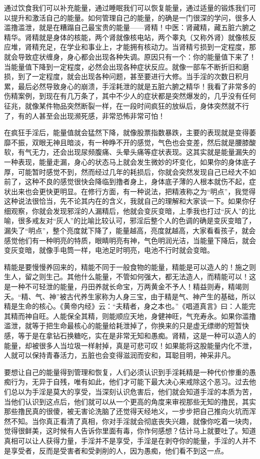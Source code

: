 通过饮食我们可以补充能量，通过睡眠我们可以恢复能量，通过适量的锻炼我们可以提升和激活自己的能量。如何管理自己的能量，的确是一门很深的学问，很多人滥撸滥泄，就是在糟蹋自己最宝贵的能量——肾精！中医：肾藏精，藏五脏六腑之精华。肾精就是身体的核能，两个肾就像核电站，两个睾丸（又称外肾）就像核反应堆，肾精充足，在学业和事业上，才能拥有核动力。当肾精亏损到一定程度，那就会导致症状缠身，身心都会出现各种失调。原因只有一个：你的能量值下来了！当能量值下降到一定程度，必然会出现各种症状反应。就像一部车不断折旧和磨损，到了一定程度，就会出现各种问题，甚至要进行大修。当手淫的次数日积月累，最后必然导致身心的崩溃，手淫耗泄的就是五脏六腑之精华！我看了非常多的伤精案例，到现在有几万条了，其中不少人的症状都是突然爆发的，几乎没有任何征兆，就像某件物品突然断裂一样，在一段时间疯狂的放纵后，身体突然就不行了，有的人甚至会出现濒死感，非常恐怖非常可怕！

在疯狂手淫后，能量值就会猛然下降，就像股票指数暴跌，主要的表现就是变得萎靡不振，双眼无神且暗淡，有一种睁不开的感觉，气色也会变差，然后就是腰膝酸软，有气无力，还会出现尿频腹痛、头晕头痛等症状表现。这其实就是能量漏失的一种表现，能量走漏，身心的状态马上就会发生微妙的坏变化，如果你的身体底子厚，可能暂时感觉不到，然而经过几年的耗损后，你就会突然发现自己已经大不如前了，这种不良的感觉很快会降临到撸者身上，身体底子薄的人根本就伤不起，症状出来也会更快更明显。在修行方面，有一种说法，把精液称之为“明点”，我觉得这种说法很恰当，先不论其内在的含义，我就自己的理解和大家谈一下。如果你仔细观察，你就会发现邪淫的人漏精后，他就会变灰变暗，上季我也打过“灰人”的比喻，很多戒友对“灰人”的比喻比较认可，邪淫后整个人的色调的确是变灰变暗了，漏失了“明点”，整个亮度就下降了，能量越高，亮度就越高，大家看看孩子，就会感觉他们有一种明亮的特质，眼睛明亮有神，气色明润光洁，当能量下降后，就会变灰变暗，就像手电筒一样，电池足时明亮，电池不行时就会变暗。

精能是要慢慢养回来的，精能不同于一般食物的能量，精能是可以造人的！施之则生人，留之则生己。其他什么能量，不管如何强大，都无法造人，而精能可以！这是一种不可轻泄的能量，丹田养就长命宝，万两黄金不予人！精益则寿，精竭则夭。“精、气、神”被古代养生家称为人身三宝，由于精是气、神产生的基础，所以精是生命的核心。《黄帝内经》云：“夫精者，身之本也。”《唱道真言》曰：人能完其精而神自旺。人能保全其精，则能顺应天地，身健神旺，气充寿永。如果你滥撸滥泄，就等于把生命最核心的能量给耗泄掉了，你换来的只是虚无缥缈的短暂快感，等于是在拿钻石换糖吃，实在是非常无知和愚痴。肾精，这是一种可以造人的能量，却被很多人当垃圾一样射掉，真是可悲可叹！如果能将这股能量内化不泄，人就可以保持青春活力，五脏也会变得滋润而安和，耳聪目明，神采非凡。

要想让自己的能量得到管理和恢复，人们必须认识到手淫耗精是一种代价惨重的愚痴行为，无异于自残，唯有如此，他们才可能下最大决心来戒除这个恶习。过去他们总以为手淫是莫大的享受，当深刻认识危害后，他们就会知道手淫的本质为苦，当他们认识到这点后，他们就可以从一个更高的角度来审视那些无知的撸民，其实那些撸民真的很傻，被无害论洗脑了还觉得天经地义，一步步把自己推向火坑而浑然不知。当你真正看清了真相，你对手淫就会彻底丧失兴趣，就像你吃着一块肉，觉得很鲜美，这时候有人告诉你里面有毒，你作何感想？估计马上就要吐了。知道真相可以让人获得力量，手淫并不是享受，手淫是在剥夺你的能量，手淫的人并不是享受者，反而是受害者和受剥削的人，因为愚痴，他们看不到这一点。

